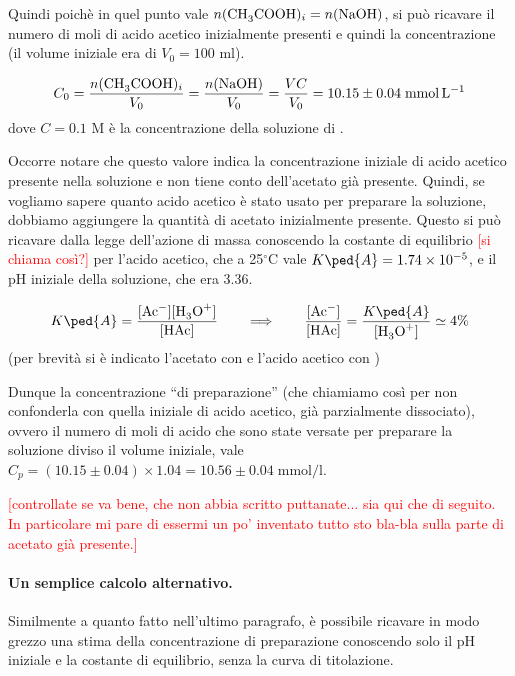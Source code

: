 Quindi poichè in quel punto vale $n(\ce{CH3COOH})_i = n(\ce{NaOH})$, si può ricavare il numero di moli di
acido acetico inizialmente presenti e quindi la concentrazione (il volume iniziale era di $V_0 = 100$ ml).

\begin{equation}
    C_0 = \frac{n(\ce{CH3COOH})_i}{V_0} = \frac{n(\ce{NaOH})}{V_0} = \frac{VC}{V_0} = 10.15 \pm 0.04 \; \si{\milli\mol\per\litre}
\end{equation}
%
dove $C = 0.1$ M è la concentrazione della soluzione di .

Occorre notare che questo valore indica la concentrazione iniziale di acido acetico presente nella soluzione
e non tiene conto dell'acetato già presente. Quindi, se vogliamo sapere quanto acido acetico è stato usato per preparare
la soluzione, dobbiamo aggiungere la quantità di acetato inizialmente presente. Questo si può ricavare
dalla legge dell'azione di massa conoscendo
la costante di equilibrio \textcolor{red}{[si chiama così?]} per l'acido acetico, che a 25$^\circ$C vale
$K\ped{A} = 1.74 \times 10^{-5}$, e il pH iniziale della soluzione, che era 3.36.

\begin{equation}
    K\ped{A} = \frac{[\ce{Ac-}][\ce{H3O+}]}{[\ce{HAc}]} \qquad
    \Longrightarrow \qquad \frac{[\ce{Ac-}]}{[\ce{HAc}]} = \frac{K\ped{A}}{[\ce{H3O+}]} \simeq 4\%
    \label{eq:massa}
\end{equation}
%
(per brevità si è indicato l'acetato con  e l'acido acetico con )

Dunque la concentrazione ``di preparazione'' (che chiamiamo così per non confonderla con quella iniziale di acido acetico,
già parzialmente dissociato), ovvero il numero di moli di acido che sono state versate per preparare la soluzione
diviso il volume iniziale, vale $C_p = (10.15 \pm 0.04) \times 1.04 = 10.56 \pm 0.04 \; \si{\milli\mol\per\litre}$.

\textcolor{red}{[controllate se va bene, che non abbia scritto puttanate... sia qui che di seguito. In particolare mi pare
di essermi un po' inventato tutto sto bla-bla sulla parte di acetato già presente.]}

\paragraph{Un semplice calcolo alternativo.}

Similmente a quanto fatto nell'ultimo paragrafo, è possibile ricavare in modo grezzo una stima
della concentrazione di preparazione conoscendo solo il pH iniziale e la costante di equilibrio, senza
la curva di titolazione.

